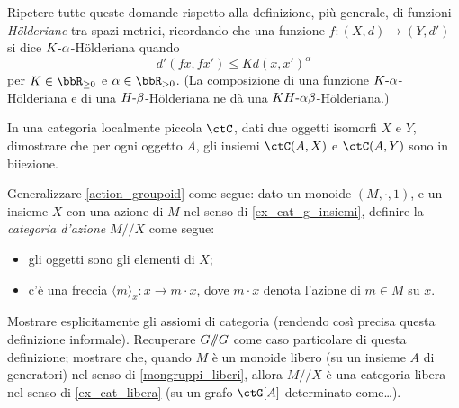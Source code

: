 \begin{esercizi}
 Ripetere tutte queste domande rispetto alla definizione, più generale, di funzioni \emph{H\"olderiane} tra spazi metrici, ricordando che una funzione \(f \colon (X,d)\to (Y,d')\) si dice \(K\text{-}\alpha\)-H\"olderiana quando
 \[d'(fx,fx')\le Kd(x,x')^\alpha\]
 per \(K\in \bbR_{\ge 0}\) e \(\alpha\in \bbR_{>0}\).
 (La composizione di una funzione \(K\text{-}\alpha\)-H\"olderiana e di una \(H\text{-}\beta\)-H\"olderiana ne dà una \(KH\text{-}\alpha\beta\)-H\"olderiana.)
 \item\label{isounico} In una categoria localmente piccola \(\ctC\), dati due oggetti isomorfi \(X\) e \(Y\), dimostrare che per ogni oggetto \(A\), gli insiemi \(\Hom{\ctC}(A,X)\) e \(\Hom{\ctC}(A,Y)\) sono in biiezione.
 \item Generalizzare \ref{action_groupoid} come segue: dato un monoide \((M,\cdot,1)\), e un insieme \(X\) con una azione di \(M\) nel senso di \ref{ex_cat_g_insiemi}, definire la \emph{categoria d'azione} \(M/\!\!/X\) come segue:
 \begin{itemize}
  \item gli oggetti sono gli elementi di \(X\);
  \item c'è una freccia \(\langle m\rangle_x \colon x\to m\cdot x\), dove \(m\cdot x\) denota l'azione di \(m\in M\) su \(x\).
 \end{itemize}
 Mostrare esplicitamente gli assiomi di categoria (rendendo così precisa questa definizione informale). Recuperare \(G/\!\!/G\)  come caso particolare di questa definizione; mostrare che, quando \(M\) è un monoide libero (su un insieme \(A\) di generatori) nel senso di \ref{mongruppi_liberi}, allora \(M/\!\!/X\) è una categoria libera nel senso di \ref{ex_cat_libera} (su un grafo \(\ctG[A]\) determinato come\dots).
\end{esercizi}
